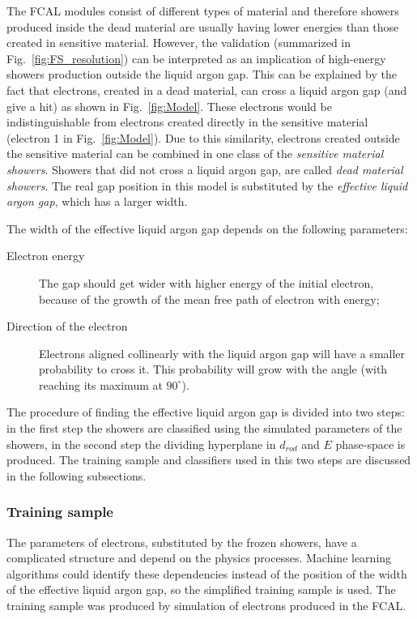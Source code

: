 The FCAL modules consist of different types of material and therefore showers produced inside the dead material are usually having lower energies than those created in sensitive material. However, the validation (summarized in Fig.~\ref{fig:FS_resolution}) can be interpreted as an implication of high-energy showers production outside the liquid argon gap. This can be explained by the fact that electrons, created in a dead material, can cross a liquid argon gap (and give a hit) as shown in Fig.~\ref{fig:Model}. These electrons would be indistinguishable from electrons created directly in the sensitive material (electron 1 in Fig.~\ref{fig:Model}).  Due to this similarity, electrons created outside the sensitive material can be combined in one class of the \textit{sensitive material showers}. Showers that did not cross a liquid argon gap, are called \textit{dead material showers}.  The real gap position in this model is substituted by the \textit{effective liquid argon gap}, which has a larger width.

The width of the effective liquid argon gap depends on the following parameters:
\begin{description}
\item [Electron energy] The gap should get wider with higher energy of the initial electron, because of the growth of the mean free path of electron with energy;
\item [Direction of the electron] Electrons aligned collinearly with the liquid argon gap will have a smaller probability to cross it. This probability will grow with the angle (with reaching its maximum at  $90^{\circ}$).
\end{description}

The procedure of finding the effective liquid argon gap is divided into two steps:  in the first step the showers are classified using the simulated parameters of the showers, in the second step the dividing hyperplane in  $d_{rod}$ and $E$ phase-space is produced. The training sample and classifiers used in this two steps are discussed in the following subsections.

\subsubsection{Training sample}

The parameters of electrons, substituted by the frozen showers, have a complicated structure and depend on the physics processes. Machine learning algorithms could identify these dependencies instead of the position of the width of the effective liquid argon gap, so the simplified training sample is used. The training sample was produced by simulation of electrons produced in the FCAL. 

